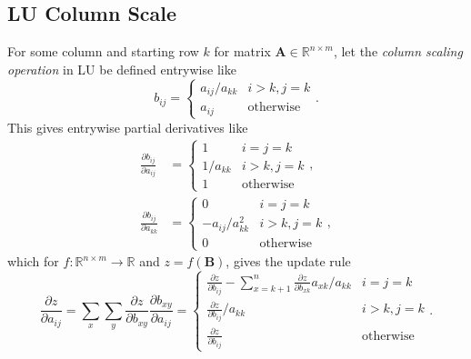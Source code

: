 \documentclass{article}
\newcommand{\mat}[1]{\bm{{#1}}}
\theoremstyle{definition}
\begin{document}
\subsection{LU Column Scale}
For some column and starting row $k$ for matrix $\mat{A} \in \mathbb{R}^{n \times m}$, let the \textit{column scaling operation} in LU be defined entrywise like
\begin{equation}
  b_{ij} = \begin{cases}
    a_{ij} / a_{kk} & i > k, j=k \\
    a_{ij} & \text{otherwise}
  \end{cases}.
\end{equation}
This gives entrywise partial derivatives like
\begin{align}
  \frac{\partial b_{ij}}{\partial a_{ij}} &= \begin{cases}
    1 & i=j=k \\
    1 / a_{kk} & i > k, j=k \\
    1 & \text{otherwise}
  \end{cases}, \\
  \frac{\partial b_{ij}}{\partial a_{kk}} &= \begin{cases}
    0 & i=j=k \\
    -a_{ij} / a_{kk}^2 & i > k, j=k \\
    0 & \text{otherwise}
  \end{cases},
\end{align}
which for $f : \mathbb{R}^{n \times m} \to \mathbb{R}$ and $z=f\left(\mat{B}\right)$, gives the update rule
\begin{equation}
  \frac{\partial z}{\partial a_{ij}} = \sum_x \sum_y \frac{\partial z}{\partial b_{xy}} \frac{\partial b_{xy}}{\partial a_{ij}} = \begin{cases}
    \frac{\partial z}{\partial b_{ij}} - \sum_{x=k+1}^n \frac{\partial z}{\partial b_{xk}} a_{xk}/a_{kk} & i=j=k \\
    \frac{\partial z}{\partial b_{ij}} / a_{kk} & i > k, j=k \\
    \frac{\partial z}{\partial b_{ij}} & \text{otherwise}
  \end{cases}.
\end{equation}


\end{document}
